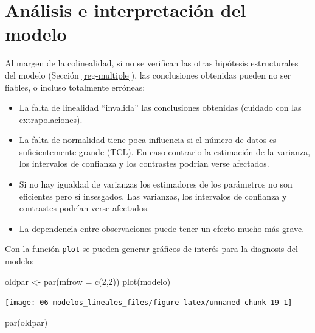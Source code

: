 \documentclass[
]{book}
\newenvironment{Shaded}{\begin{snugshade}}{\end{snugshade}}
\newcommand{\AttributeTok}[1]{\textcolor[rgb]{0.77,0.63,0.00}{#1}}
\newcommand{\DecValTok}[1]{\textcolor[rgb]{0.00,0.00,0.81}{#1}}
\newcommand{\FunctionTok}[1]{\textcolor[rgb]{0.00,0.00,0.00}{#1}}
\newcommand{\NormalTok}[1]{#1}
\newcommand{\OtherTok}[1]{\textcolor[rgb]{0.56,0.35,0.01}{#1}}
\theoremstyle{break}
\theoremstyle{definition}
\theoremstyle{definition}
\theoremstyle{definition}
\theoremstyle{definition}
\theoremstyle{remark}
\begin{document}
\hypertarget{analisis-reg-multiple}{%
\section{Análisis e interpretación del modelo}\label{analisis-reg-multiple}}

Al margen de la colinealidad, si no se verifican las otras hipótesis estructurales del modelo (Sección \ref{reg-multiple}), las conclusiones obtenidas pueden no ser fiables, o incluso totalmente erróneas:

\begin{itemize}
\item
  La falta de linealidad ``invalida'' las conclusiones obtenidas
  (cuidado con las extrapolaciones).
\item
  La falta de normalidad tiene poca influencia si el
  número de datos es suficientemente grande (TCL). En caso contrario
  la estimación de la varianza, los intervalos de confianza y los
  contrastes podrían verse afectados.
\item
  Si no hay igualdad de varianzas los estimadores de los
  parámetros no son eficientes pero sí insesgados. Las varianzas, los
  intervalos de confianza y contrastes podrían verse afectados.
\item
  La dependencia entre observaciones puede tener un efecto mucho
  más grave.
\end{itemize}

Con la función \texttt{plot} se pueden generar gráficos de interés para la diagnosis del modelo:

\begin{Shaded}
\begin{Highlighting}[]
\NormalTok{oldpar }\OtherTok{\textless{}{-}} \FunctionTok{par}\NormalTok{(}\AttributeTok{mfrow =} \FunctionTok{c}\NormalTok{(}\DecValTok{2}\NormalTok{,}\DecValTok{2}\NormalTok{))}
\FunctionTok{plot}\NormalTok{(modelo)}
\end{Highlighting}
\end{Shaded}

\begin{center}\texttt{[image: 06-modelos\_lineales\_files/figure-latex/unnamed-chunk-19-1]} \end{center}

\begin{Shaded}
\begin{Highlighting}[]
\FunctionTok{par}\NormalTok{(oldpar)}
\end{Highlighting}
\end{Shaded}
\end{document}
